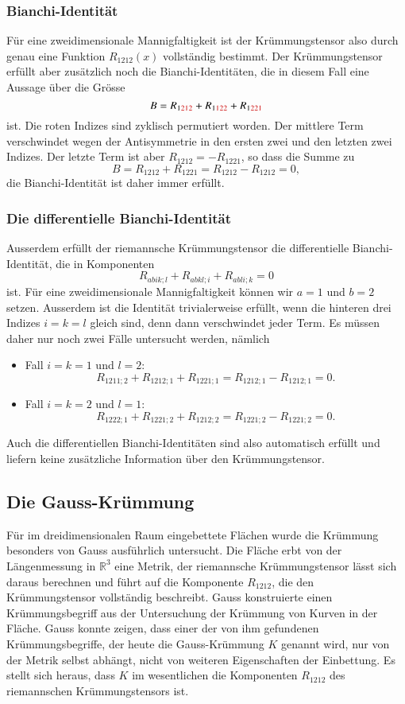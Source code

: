 \subsubsection{Bianchi-Identität}
Für eine zweidimensionale Mannigfaltigkeit ist der Krümmungstensor also
durch genau eine Funktion $R_{1212}(x)$ vollständig bestimmt.
Der Krümmungstensor erfüllt aber zusätzlich noch die Bianchi-Identitäten,
die in diesem Fall eine Aussage über die Grösse
\[
B
=
R_{1{\color{darkred}212}}
+
R_{1{\color{darkred}122}}
+
R_{1{\color{darkred}221}}
\]
ist.
Die roten Indizes sind zyklisch permutiert worden.
Der mittlere Term verschwindet wegen der Antisymmetrie in den ersten
zwei und den letzten zwei Indizes.
Der letzte Term ist aber $R_{1212}=-R_{1221}$, so dass die Summe zu
\[
B
=
R_{1212}+R_{1221}
=
R_{1212}-R_{1212}
=
0,
\]
die Bianchi-Identität ist daher immer erfüllt.

\subsubsection{Die differentielle Bianchi-Identität}
Ausserdem erfüllt der riemannsche Krümmungstensor die differentielle
Bianchi-Identität, die in Komponenten
\[
R_{abik;l}
+
R_{abkl;i}
+
R_{abli;k}
=
0
\]
ist.
Für eine zweidimensionale Mannigfaltigkeit können wir $a=1$ und $b=2$
setzen.
Ausserdem ist die Identität trivialerweise erfüllt, wenn die hinteren
drei Indizes $i=k=l$ gleich sind, denn dann verschwindet jeder Term.
Es müssen daher nur noch zwei Fälle untersucht werden, nämlich
\begin{itemize}
\item Fall $i=k=1$ und $l=2$:
\[
R_{1211;2} + R_{1212;1} + R_{1221;1} 
=
R_{1212;1}-R_{1212;1} = 0.
\]
\item Fall $i=k=2$ und $l=1$:
\[
R_{1222;1} + R_{1221;2} + R_{1212;2}  
=
R_{1221;2} - R_{1221;2}
=
0.
\]
\end{itemize}
Auch die differentiellen Bianchi-Identitäten sind also automatisch
erfüllt und liefern keine zusätzliche Information über den Krümmungstensor.

%
%
\subsection{Die Gauss-Krümmung}
Für im dreidimensionalen Raum eingebettete Flächen wurde die Krümmung
besonders von Gauss ausführlich untersucht.
Die Fläche erbt von der Längenmessung in $\mathbb{R}^3$ eine
Metrik, der riemannsche Krümmungstensor lässt sich daraus berechnen
und führt auf die Komponente $R_{1212}$, die den Krümmungstensor vollständig
beschreibt.
Gauss konstruierte einen Krümmungsbegriff aus der Untersuchung der
Krümmung von Kurven in der Fläche.
Gauss konnte zeigen, dass einer der von ihm gefundenen Krümmungsbegriffe,
der heute die Gauss-Krümmung $K$ genannt wird, nur von der Metrik selbst
abhängt, nicht von weiteren Eigenschaften der Einbettung.
Es stellt sich heraus, dass  $K$ im wesentlichen die Komponenten $R_{1212}$
des riemannschen Krümmungstensors ist.

